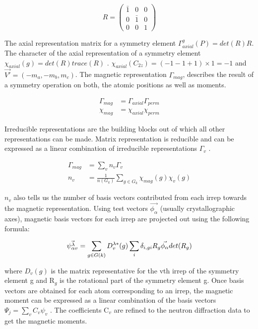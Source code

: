 \documentclass[letterpaper,10pt,doublespacing,edeposit]{uiucthesis2020}
\begin{document}
\begin{mainmatter}
\begin{equation*}
R = \begin{pmatrix} \bar{1} & 0 & 0\\ 0 & \bar{1} & 0\\ 0 & 0 & 1 \end{pmatrix}
\end{equation*}

The axial representation matrix for a symmetry element $\Gamma_{axial}^g(P) = det(R)R$. The character of the axial representation of a symmetry element  $\chi_{axial}(g) = det(R)trace(R)$ \cite{Wills2001}. $\chi_{axial}(C_{2z}) = (-1-1+1) \times 1 = -1$ and $\vec{V'} = (-m_a, -m_b, m_c)$. The magnetic representation $\Gamma_{mag}$, describes the result of a symmetry operation on both, the atomic positions as well as moments.

\begin{align}
\Gamma_{mag} &= \Gamma_{axial} \Gamma_{perm}\\
\chi_{mag} &= \chi_{axial} \chi_{perm}
\end{align}

Irreducible representations are the building blocks out of which all other representations can be made. Matrix representation is reducible and can be expressed as a linear combination of irreducible representations $\Gamma_v$ \cite{Wills2001}.

\begin{align}
\Gamma_{mag} &= \sum_v n_v \Gamma_v \\
n_v &= \frac{1}{n(G_k)} \sum_{g \in G_k} \chi_{mag}(g) \chi_v(g)
\end{align}

$n_v$ also tells us the number of basis vectors contributed from each irrep towards the magnetic representation. Using test vectors $\vec{\phi_{\alpha}}$ (usually crystallographic axes), magnetic basis vectors for each irrep are projected out using the following formula:

\begin{equation}
\vec{\psi_{\alpha v}^\lambda} = \sum_{g \in G(k)} D_v^{\lambda*}(g) \sum_i \delta_{i,gi} R_g \vec{\phi_{\alpha}} det(R_g) \\
\end{equation}

where $D_v(g)$ is the matrix representative for the vth irrep of the symmetry element g and R$_g$ is the rotational part of the symmetry element g. Once basis vectors are obtained for each atom corresponding to an irrep, the magnetic moment can be expressed as a linear combination of the basis vectors $\Psi_j = \sum_v C_v \psi_v$ \cite{Wills2001}. The coefficients C$_v$ are refined to the neutron diffraction data to get the magnetic moments.




\end{mainmatter}
\end{document}
